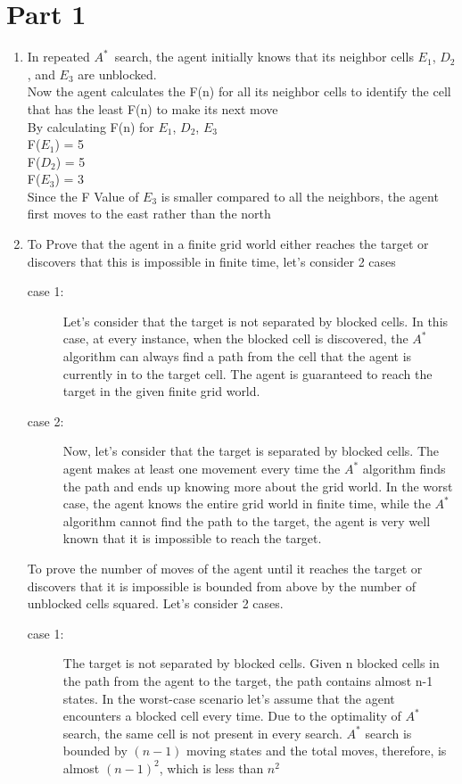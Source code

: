 \documentclass{article}
\begin{document}
\section*{Part 1}
\renewcommand{\labelenumi}{\alph{enumi})}
\begin{enumerate}
    \item In repeated $A^*$\ search, the agent initially knows that its neighbor cells $E_1$, $D_2$, and $E_3$ are unblocked.\\
    Now the agent calculates the F(n) for all its neighbor cells to identify the cell that has the least F(n) to make its next move\\
    By calculating F(n) for $E_1$, $D_2$, $E_3$\\
    F($E_1$) = 5\\
    F($D_2$) = 5\\
    F($E_3$) = 3\\
    Since the F Value of $E_3$ is smaller compared to all the neighbors, the agent first moves to the east rather than the north
    \item To Prove that the agent in a finite grid world either reaches the target or discovers that this is impossible in finite time, let's consider 2 cases
    \begin{description}
    \item[case 1:]Let's consider that the target is not separated by blocked cells. In this case, at every instance, when the blocked cell is discovered, the $A^*$ algorithm can always find a path from the cell that the agent is currently in to the target cell. The agent is guaranteed to reach the target in the given finite grid world.
    \item[case 2:] Now, let's consider that the target is separated by blocked cells. The agent makes at least one movement every time the $A^*$ algorithm finds the path and ends up knowing more about the grid world. In the worst case, the agent knows the entire grid world in finite time, while the $A^*$ algorithm cannot find the path to the target, the agent is very well known that it is impossible to reach the target.
    \end{description}
    To prove the number of moves of the agent until it reaches the target or discovers that it is impossible is bounded from above by the number of unblocked cells squared. Let's consider 2 cases.
    \begin{description}
    \item[case 1:] The target is not separated by blocked cells. Given n blocked cells in the path from the agent to the target, the path contains almost n-1 states. In the worst-case scenario let's assume that the agent encounters a blocked cell every time. Due to the optimality of $A^*$ search, the same cell is not present in every search. $A^*$ search is bounded by $(n-1)$ moving states and the total moves, therefore, is almost $(n-1)^2$, which is less than $n^2$

\end{description}
\end{enumerate}
\end{document}
